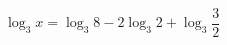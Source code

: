 \begin{ex}[type=equation]
	\begin{condition}
		$\log_3 x = \log_3 8 - 2\log_3 2+\log_3 \dfrac{3}{2}$
	\end{condition}
\end{ex}